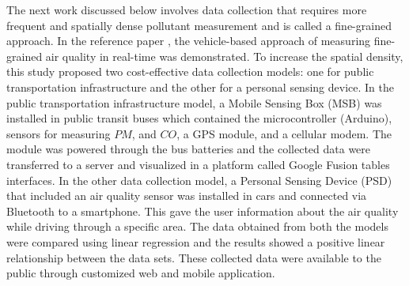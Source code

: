 The next work discussed below involves data collection that requires more frequent and spatially dense pollutant measurement and is called a fine-grained approach. In the reference paper \cite{Devarakonda2013}, the vehicle-based approach of measuring fine-grained air quality in real-time was demonstrated. To increase the spatial density, this study proposed two cost-effective data collection models: one for public transportation infrastructure and the other for a personal sensing device. In the public transportation infrastructure model, a Mobile Sensing Box (MSB) was installed in public transit buses which contained the microcontroller (Arduino), sensors for measuring $PM$, and $CO$, a GPS module, and a cellular modem. The module was powered through the bus batteries and the collected data were transferred to a server and visualized in a platform called Google Fusion tables interfaces. In the other data collection model, a Personal Sensing Device (PSD) that included an air quality sensor was installed in cars and connected via Bluetooth to a smartphone. This gave the user information about the air quality while driving through a specific area.
The data obtained from both the models were compared using linear regression and the results showed a positive linear relationship between the data sets. These collected data were available to the public through customized web and mobile application. %

\par



